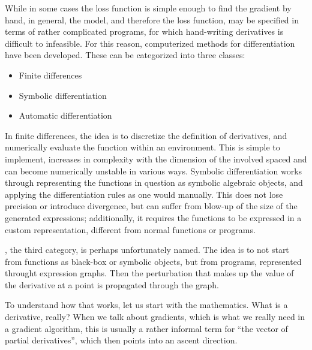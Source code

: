 While in some cases the loss function is simple enough to find the gradient by hand, in general, the
model, and therefore the loss function, may be specified in terms of rather complicated programs,
for which hand-writing derivatives is difficult to infeasible.  For this reason, computerized
methods for differentiation have been developed.  These can be categorized into three classes:
\begin{itemize}
  \firmlist
\item Finite differences
\item Symbolic differentiation
\item Automatic differentiation
\end{itemize}
In finite differences, the idea is to discretize the definition of derivatives, and numerically
evaluate the function within an environment.  This is simple to implement, increases in complexity
with the dimension of the involved spaced and can become numerically unstable in various ways.
Symbolic differentiation works through representing the functions in question as symbolic algebraic
objects, and applying the differentiation rules as one would manually.  This does not lose precision
or introduce divergence, but can suffer from blow-up of the size of the generated expressions;
additionally, it requires the functions to be expressed in a custom representation, different from
normal functions or programs.

, the third category, is perhaps unfortunately named.  The
idea is to not start from functions as black-box or symbolic objects, but from programs, represented
throught expression graphs.  Then the perturbation that makes up the value of the derivative at a
point is propagated through the graph.

To understand how that works, let us start with the mathematics.  What is a derivative, really?
When we talk about gradients, which is what we really need in a gradient algorithm, this is usually
a rather informal term for \enquote{the vector of partial derivatives}, which then points into an
ascent direction.

